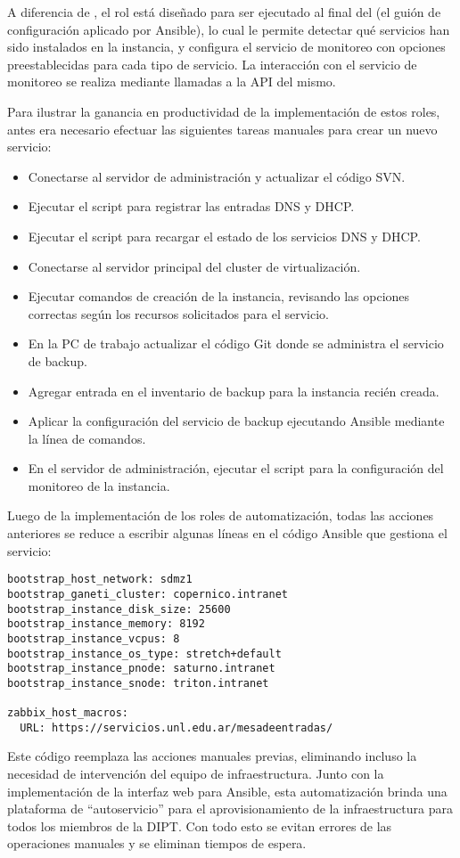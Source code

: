 %
A diferencia de , el rol  está
diseñado para ser ejecutado al final del  (el guión
de configuración aplicado por Ansible), lo cual le permite detectar
qué servicios han sido instalados en la instancia, y configura el
servicio de monitoreo con opciones preestablecidas para cada tipo de
servicio. La interacción con el servicio de monitoreo se realiza
mediante llamadas a la API del mismo.

Para ilustrar la ganancia en productividad de la implementación de
estos roles, antes era necesario efectuar las siguientes tareas
manuales para crear un nuevo servicio:
%
\begin{itemize}
\item Conectarse al servidor de administración y actualizar el código
  SVN.
\item Ejecutar el script para registrar las entradas DNS y DHCP.
\item Ejecutar el script para recargar el estado de los servicios DNS
  y DHCP.
\item Conectarse al servidor principal del cluster de virtualización.
\item Ejecutar comandos de creación de la instancia, revisando las
  opciones correctas según los recursos solicitados para el servicio.
\item En la PC de trabajo actualizar el código Git donde se administra
  el servicio de backup.
\item Agregar entrada en el inventario de backup para la instancia
  recién creada.
\item Aplicar la configuración del servicio de backup ejecutando
  Ansible mediante la línea de comandos.
\item En el servidor de administración, ejecutar el script para la
  configuración del monitoreo de la instancia.
\end{itemize}
%
Luego de la implementación de los roles de automatización, todas las
acciones anteriores se reduce a escribir algunas líneas en el código
Ansible que gestiona el servicio:
%
\iflatexml\else
{}
\fi
\begin{Verbatim}
bootstrap_host_network: sdmz1
bootstrap_ganeti_cluster: copernico.intranet
bootstrap_instance_disk_size: 25600
bootstrap_instance_memory: 8192
bootstrap_instance_vcpus: 8
bootstrap_instance_os_type: stretch+default
bootstrap_instance_pnode: saturno.intranet
bootstrap_instance_snode: triton.intranet

zabbix_host_macros:
  URL: https://servicios.unl.edu.ar/mesadeentradas/
\end{Verbatim}
%
Este código reemplaza las acciones manuales previas, eliminando
incluso la necesidad de intervención del equipo de
infraestructura. Junto con la implementación de la interfaz web para
Ansible, esta automatización brinda una plataforma de ``autoservicio''
para el aprovisionamiento de la infraestructura para todos los
miembros de la DIPT. Con todo esto se evitan errores de las
operaciones manuales y se eliminan tiempos de espera.
%
%
